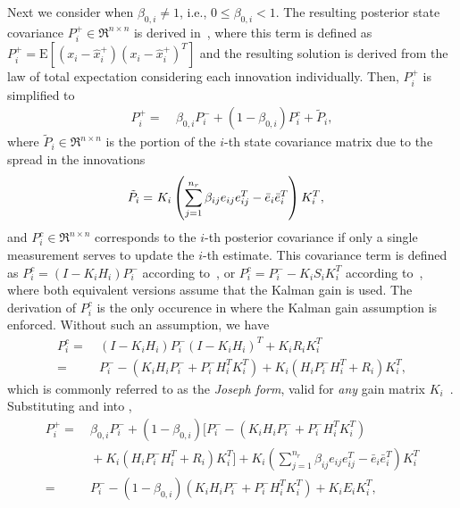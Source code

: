 Next we consider when $\beta_{0,i}\neq1$, i.e., $0\leq\beta_{0,i}<1$.
The resulting posterior state covariance $P^+_{i}\in\Re^{n\times n}$ is derived in~\cite[Eq. D-32 and D-33]{TrackDataAssoc}, where this term is defined as $P^+_{i}=\text{E}[(x_i-\hat x_i^+)(x_i-\hat x_i^+)^T]$ and the resulting solution is derived from the law of total expectation considering each innovation individually. Then, $P^+_{i}$ is simplified to
\begin{align}
\label{eqn:JPDAFCov}
P^+_{i}=&\ \beta_{0,i}P^-_{i}+(1-\beta_{0,i})P_i^c+\tilde P_i,
\end{align}
where $\tilde P_i\in\Re^{n\times n}$ is the portion of the $i$-th state covariance matrix due to the spread in the innovations
\begin{align}
\tilde P_i=&\ K_i\left( {\sum_{j=1}^{n_r} \beta_{ij}e_{ij}e_{ij}^T-{\bar{e}}_{i}}{\bar{e}}_{i}^T \right)K_{i}^T,\label{eqn:tildeP}
\end{align}
and $P_i^c\in\Re^{n\times n}$ corresponds to the $i$-th posterior covariance if only a single measurement serves to update the $i$-th estimate.
This covariance term is defined as $P^c_i=(I-K_iH_i)P_i^-$ according to~\cite[Eq. D-27]{TrackDataAssoc}, or $P^c_i=P_i^--K_iS_iK_i^T$ according to~\cite[Eq. 43]{JPDAF1}, where both equivalent versions assume that the Kalman gain is used. The derivation of $P^c_i$ is the only occurence in  where the Kalman gain assumption is enforced. Without such an assumption, we have%
\begin{align}
P^c_i=&\ (I-K_iH_i)P^-_i(I-K_iH_i)^T+K_iR_iK_i^T\nonumber
\\
=&\ P^-_i-(K_iH_iP^-_i+P^-_iH_i^TK_i^T)+K_i(H_iP^-_iH_i^T+R_i)K_i^T,
\label{eqn:GenCov}
\end{align}
which is commonly referred to as the \emph{Joseph form}, valid for \emph{any} gain matrix $K_i$~\cite{OptEst1}.
Substituting  and  into ,%
\begin{align}
P^+_{i}=&\ \beta_{0,i}P^-_{i}+(1-\beta_{0,i})[P^-_i-(K_iH_iP^-_i+P^-_iH_i^TK_i^T)\nonumber
\\
&\ +K_i(H_iP^-_iH_i^T+R_i)K_i^T]+K_i\left({\sum_{j=1}^{n_r} \beta_{ij}e_{ij}e_{ij}^T-{\bar{e}}_{i}}{\bar{e}}_{i}^T\right)K_{i}^T\nonumber
\\
=&\ P^-_{i}-(1-\beta_{0,i})(K_iH_iP^-_i+P^-_iH_i^TK_i^T)+K_iE_iK_i^T,\label{eqn:CovExpanded}
\end{align}
